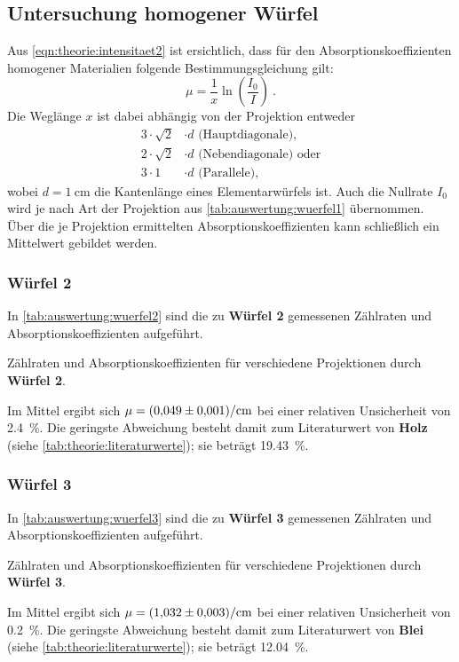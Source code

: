 \subsection{Untersuchung homogener Würfel}
Aus \autoref{eqn:theorie:intensitaet2} ist ersichtlich,
dass für den Absorptionskoeffizienten homogener Materialien folgende Bestimmungsgleichung gilt:
\begin{equation*}
    \mu = \frac{1}{x} \ln \left( \frac{I_0}{I} \right) \ .
\end{equation*}
Die Weglänge $x$ ist dabei abhängig von der Projektion entweder
\begin{align*}
    3·\sqrt{2}&·d \text{ (Hauptdiagonale),} \\
    2·\sqrt{2}&·d \text{ (Nebendiagonale) oder} \\
    3·1       &·d \text{ (Parallele),}
\end{align*}
wobei $d = \SI{1}{\centi\meter}$ die Kantenlänge eines Elementarwürfels ist.
Auch die Nullrate $I_0$ wird je nach Art der Projektion aus \autoref{tab:auswertung:wuerfel1} übernommen.
Über die je Projektion ermittelten Absorptionskoeffizienten kann schließlich ein Mittelwert gebildet werden.


\subsubsection{Würfel 2} \label{sec:auswertung:wuerfel2}
In \autoref{tab:auswertung:wuerfel2} sind die zu \textbf{Würfel 2} gemessenen Zählraten und Absorptionskoeffizienten aufgeführt.
\begin{table}[H]
    \centering
    \caption{Zählraten und Absorptionskoeffizienten für verschiedene Projektionen durch \textbf{Würfel 2}.}
    \label{tab:auswertung:wuerfel2}
\end{table}
Im Mittel ergibt sich $\mu = \SI{0.049 \pm 0.001}{\per\centi\meter}$
bei einer relativen Unsicherheit von \SI{2.4}{\percent}.
Die geringste Abweichung besteht damit zum Literaturwert von \textbf{Holz} (siehe \autoref{tab:theorie:literaturwerte});
sie beträgt \SI{19.43}{\percent}.


\subsubsection{Würfel 3} \label{sec:auswertung:wuerfel3}
In \autoref{tab:auswertung:wuerfel3} sind die zu \textbf{Würfel 3} gemessenen Zählraten und Absorptionskoeffizienten aufgeführt.
\begin{table}[H]
    \centering
    \caption{Zählraten und Absorptionskoeffizienten für verschiedene Projektionen durch \textbf{Würfel 3}.}
    \label{tab:auswertung:wuerfel3}
\end{table}
Im Mittel ergibt sich $\mu = \SI{1.032 \pm 0.003}{\per\centi\meter}$
bei einer relativen Unsicherheit von \SI{0.2}{\percent}.
Die geringste Abweichung besteht damit zum Literaturwert von \textbf{Blei} (siehe \autoref{tab:theorie:literaturwerte});
sie beträgt \SI{12.04}{\percent}.


